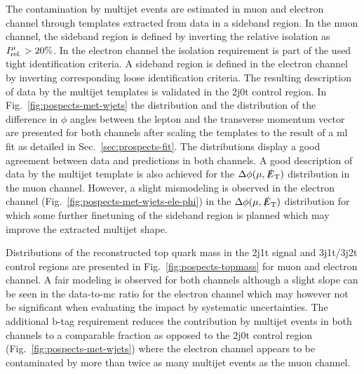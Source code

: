 

The contamination by multijet events are estimated in muon and electron channel through templates extracted from data in a sideband region. In the muon channel, the sideband region is defined by inverting the relative isolation as $\muiso>20\%$. In the electron channel the isolation requirement is part of the used tight identification criteria. A sideband region is defined in the electron channel by inverting corresponding loose identification criteria. The resulting description of data by the multijet templates is validated in the 2j0t control region. In Fig.~\ref{fig:pospects-met-wjets} the \met distribution and the distribution of the difference in $\phi$ angles between the lepton and the transverse momentum vector are presented for both channels after scaling the templates to the result of a \gls{ml} fit as detailed in Sec.~\ref{sec:prospects-fit}. The \met distributions display a good agreement between data and predictions in both channels. A good description of data by the multijet template is also achieved for the $\Delta\phi(\mu,\slashed{E}_{\textrm{T}})$ distribution in the muon channel. However, a slight mismodeling is observed in the electron channel (Fig.~\ref{fig:pospects-met-wjets-ele-phi}) in the $\Delta\phi(\mu,\slashed{E}_{\textrm{T}})$ distribution for which some further finetuning of the sideband region is planned which may improve the extracted multijet shape.

Distributions of the reconstructed top quark mass in the 2j1t signal and 3j1t/3j2t \ttbar control regions are presented in Fig.~\ref{fig:pospects-topmass} for muon and electron channel. A fair modeling is observed for both channels although a slight slope can be seen in the data-to-\gls{mc} ratio for the electron channel which may however not be significant when evaluating the impact by systematic uncertainties. The additional b-tag requirement reduces the contribution by multijet events in both channels to a comparable fraction as opposed to the 2j0t control region (Fig.~\ref{fig:pospects-met-wjets}) where the electron channel appears to be contaminated by more than twice as many multijet events as the muon channel. 


